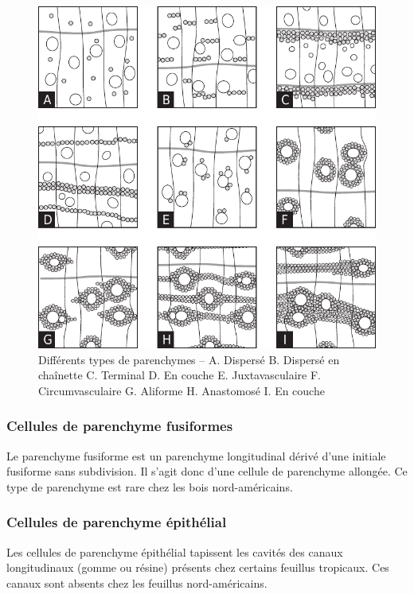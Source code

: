 \begin{figure}[h]
\centering
\includegraphics[scale=0.75]{img/ch4_parenchymes}
\caption{Différents types de parenchymes -- A. Dispersé B. Dispersé en chaînette C. Terminal D. En couche E. Juxtavasculaire F. Circumvasculaire G. Aliforme H. Anastomosé I. En couche}
\label{fig:parenchymes_feuillus}
\end{figure}

\subsubsection{Cellules de parenchyme fusiformes}

Le parenchyme fusiforme est un parenchyme longitudinal dérivé d'une initiale fusiforme sans subdivision.  Il s'agit donc d'une cellule de parenchyme allongée.  Ce type de parenchyme est rare chez les bois nord-américains.

\subsubsection{Cellules de parenchyme épithélial}

Les cellules de parenchyme épithélial tapissent les cavités des canaux longitudinaux (gomme ou résine) présents chez certains feuillus tropicaux.  Ces canaux sont absents chez les feuillus nord-américains.


